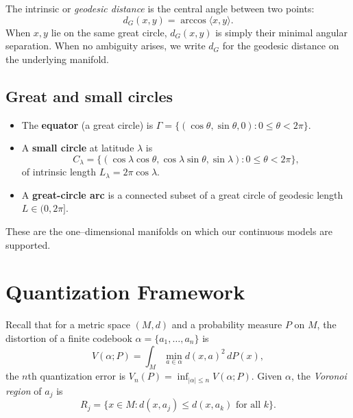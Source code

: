 \documentclass[12pt, reqno]{amsart}
\theoremstyle{plain}
\theoremstyle{definition}
\newcommand{\gq}{\theta}
\begin{document}
The intrinsic or \emph{geodesic distance} is the central angle between two points:
\[
d_G(x,y)=\arccos\langle x,y\rangle.
\]
When $x,y$ lie on the same great circle, $d_G(x,y)$ is simply their minimal angular separation. When no ambiguity arises, we write $d_G$ for the geodesic distance on the underlying manifold.


\subsection{Great and small circles}
\begin{itemize}
\item The \textbf{equator} (a great circle) is $\Gamma=\{(\cos\gq,\sin\gq,0):0\le\gq<2\pi\}$.
\item A \textbf{small circle} at latitude $\lambda$ is
\[
C_\lambda=\{(\cos\lambda\cos\gq,\cos\lambda\sin\gq,\sin\lambda):0\le\gq<2\pi\},
\]
of intrinsic length $L_\lambda=2\pi\cos\lambda$.
\item A \textbf{great-circle arc} is a connected subset of a great circle of geodesic length $L\in(0,2\pi]$.
\end{itemize}

These are the one--dimensional manifolds on which our continuous models are supported.
 \section{Quantization Framework}
Recall that for a metric space $(M,d)$ and a probability measure $P$ on $M$, the distortion of a finite codebook $\alpha=\{a_1,\dots,a_n\}$ is
\[
V(\alpha;P)=\int_M \min_{a\in\alpha}d(x,a)^2\,dP(x), 
\]
the $n$th quantization error is $V_n(P)=\inf_{|\alpha|\le n}V(\alpha;P)$.
Given $\alpha$, the \emph{Voronoi region} of $a_j$ is
\[
R_j=\{x\in M:d(x,a_j)\le d(x,a_k)\text{ for all }k\}.
\]
\end{document}

